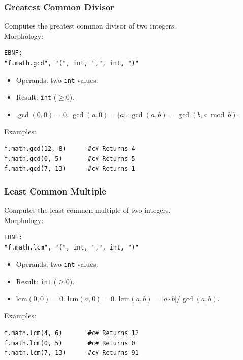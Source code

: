\subsubsection{Greatest Common Divisor}
Computes the greatest common divisor of two integers. \\
Morphology:
\begin{verbatim}
EBNF:
"f.math.gcd", "(", int, ",", int, ")"
\end{verbatim}
\begin{itemize}
\item Operands: two \texttt{int} values.
\item Result: \texttt{int} ($\geq 0$).
\item $\gcd(0, 0) = 0$. $\gcd(a, 0) = |a|$. $\gcd(a, b) = \gcd(b, a \bmod b)$.
\end{itemize}
Examples:
\begin{verbatim}
f.math.gcd(12, 8)      #c# Returns 4
f.math.gcd(0, 5)       #c# Returns 5
f.math.gcd(7, 13)      #c# Returns 1
\end{verbatim}

\subsubsection{Least Common Multiple}
Computes the least common multiple of two integers. \\
Morphology:
\begin{verbatim}
EBNF:
"f.math.lcm", "(", int, ",", int, ")"
\end{verbatim}
\begin{itemize}
\item Operands: two \texttt{int} values.
\item Result: \texttt{int} ($\geq 0$).
\item $\text{lcm}(0, 0) = 0$. $\text{lcm}(a, 0) = 0$. $\text{lcm}(a, b) = |a \cdot b| / \gcd(a, b)$.
\end{itemize}
Examples:
\begin{verbatim}
f.math.lcm(4, 6)       #c# Returns 12
f.math.lcm(0, 5)       #c# Returns 0
f.math.lcm(7, 13)      #c# Returns 91
\end{verbatim}

